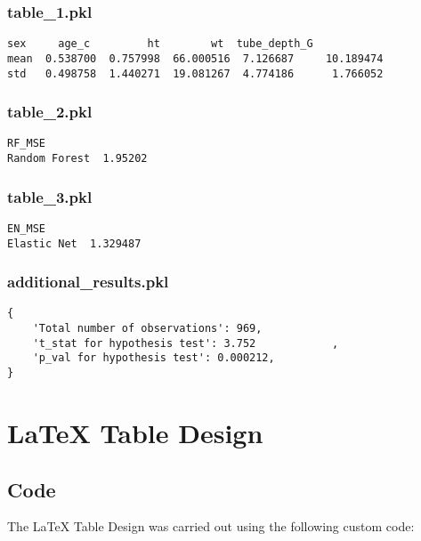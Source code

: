 \documentclass[11pt]{article}
\begin{document}
\subsubsection*{table\_1.pkl}

\begin{Verbatim}[tabsize=4]
           sex     age_c         ht        wt  tube_depth_G
mean  0.538700  0.757998  66.000516  7.126687     10.189474
std   0.498758  1.440271  19.081267  4.774186      1.766052
\end{Verbatim}

\subsubsection*{table\_2.pkl}

\begin{Verbatim}[tabsize=4]
                RF_MSE
Random Forest  1.95202
\end{Verbatim}

\subsubsection*{table\_3.pkl}

\begin{Verbatim}[tabsize=4]
               EN_MSE
Elastic Net  1.329487
\end{Verbatim}

\subsubsection*{additional\_results.pkl}

\begin{Verbatim}[tabsize=4]
{
    'Total number of observations': 969,
    't_stat for hypothesis test': 3.752            ,
    'p_val for hypothesis test': 0.000212,
}
\end{Verbatim}

\section{LaTeX Table Design}
\subsection{{Code}}
The LaTeX Table Design was carried out using the following custom code:
\end{document}
